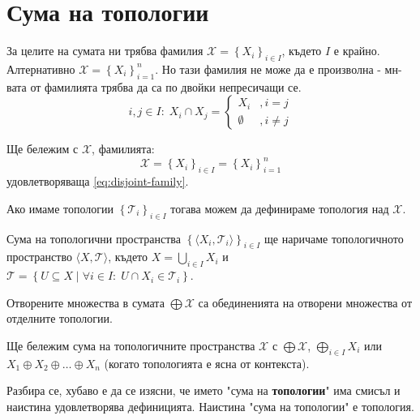 \section{Сума на топологии}
За целите на сумата ни трябва фамилия $\mathcal X = \left\{X_i\right\}_{i \in I}$, където $I$ е крайно. Алтернативно $\mathcal X = \left\{X_i\right\}_{i=1}^{n}$. Но тази фамилия не може да е произволна - мн-вата от фамилията трябва да са по двойки непресичащи се.
\begin{equation} \label{eq:disjoint-family}
    i,j \in I:\; X_i \cap X_j = \begin{cases}
        X_i       & , i=j     \\
        \emptyset & , i\neq j
    \end{cases}
\end{equation}
\begin{notation}
    Ще бележим с $\mathcal X$, фамилията:
    \begin{equation*}
        \mathcal X = \left\{X_i\right\}_{i \in I} = \left\{X_i\right\}_{i=1}^{n}
    \end{equation*}
    удовлетворяваща \eqref{eq:disjoint-family}.
\end{notation}

Ако имаме топологии $\left\{\mathcal T_i\right\}_{i \in I}$ тогава можем да дефинираме топология над $\mathcal X$.
\begin{definition}\label{def:sum-topologies}
    Сума на топологични пространства $\left\{\langle X_i, \mathcal T_i\rangle\right\}_{i \in I}$ ще наричаме топологичното пространство $\langle X, \mathcal T\rangle$, където $X = \bigcup\limits_{i\in I}X_i$ и $\mathcal T = \left\{ U \subseteq X \mid \forall i \in I:\; U \cap X_i \in \mathcal T_i \right\}$.
\end{definition}
\begin{fact}
    Отворените множества в сумата $\bigoplus \mathcal X$ са обединенията на отворени множества от отделните топологии.
\end{fact}
\begin{notation}
    Ще бележим сума на топологичните пространства $\mathcal X$ с $\bigoplus \mathcal X$, $\bigoplus\limits_{i\in I} X_i$ или $X_1 \oplus X_2 \oplus \dots \oplus X_n$ (когато топологията е ясна от контекста).
\end{notation}
Разбира се, хубаво е да се изясни, че името "сума на \textbf{топологии}" има смисъл и наистина удовлетворява дефиницията. Наистина "сума на топологии" е топология.

